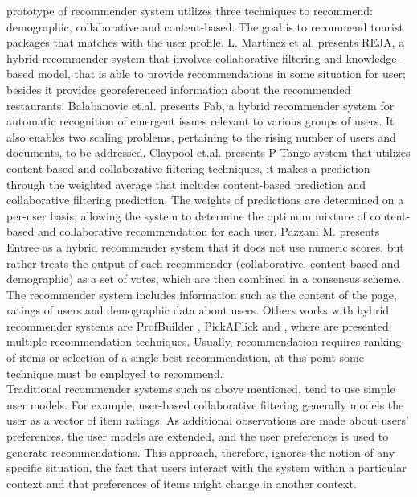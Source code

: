 prototype of recommender system utilizes three techniques to
recommend: demographic, collaborative and content-based. The goal is
to recommend tourist packages that matches with the user profile.
L. Martinez et al.\cite{martinez2009reja} presents REJA, a hybrid
recommender system that involves collaborative filtering and
knowledge-based model, that is able to provide recommendations in some
situation for user; besides it provides georeferenced information
about the recommended restaurants.
Balabanovic et.al. \cite{balabanovic1997fab} presents
Fab, a hybrid recommender system for automatic recognition of
emergent issues relevant to various groups of users. It also enables
two scaling problems, pertaining to the rising number of users and
documents, to be addressed. Claypool et.al.\cite{claypool1999combining} 
presents P-Tango system that utilizes content-based and collaborative
filtering techniques, it makes a prediction through the weighted
average that includes content-based prediction and collaborative
filtering prediction. The weights of predictions are determined on a
per-user basis, allowing the system to determine the optimum mixture
of content-based and collaborative recommendation for each user.
Pazzani M.\cite{pazzani1999framework} presents Entree as a hybrid
recommender system that it does not use numeric scores, but rather
treats the output of each recommender (collaborative, content-based
and demographic) as a set of votes, which are then combined in a
consensus scheme. The recommender system includes information such as
the content of the page, ratings of users and demographic data about
users. Others works with hybrid recommender systems are ProfBuilder
\cite{al1999semantic}, PickAFlick\cite{burke1999integrating}  and
\cite{tran2000hybrid}, where are presented multiple recommendation
techniques. Usually, recommendation requires ranking of
items or selection of a single best recommendation, at this point some
technique must be employed to recommend. \\ 
Traditional recommender systems such as above mentioned, tend to use
simple user models. For example, user-based collaborative filtering
generally models the user as a vector of item ratings. As additional
observations are made about users’ preferences, the user models are
extended, and the user preferences is used to generate
recommendations. This approach, therefore, ignores the notion of any
specific situation, the fact that users interact with the system
within a particular context and  that preferences of items might 
change in another context. \\
